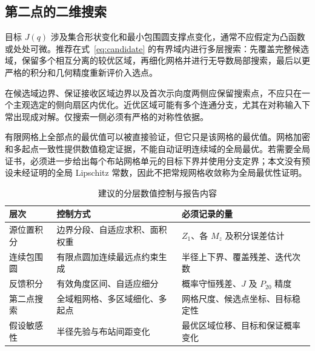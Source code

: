 \documentclass[UTF8,a4paper,zihao=-4,fontset=none]{ctexart}
\numberwithin{equation}{section}
\theoremstyle{definition}
\begin{document}
\subsection{第二点的二维搜索}
目标 \(J(q)\) 涉及集合形状变化和最小包围圆支撑点变化，通常不应假定为凸函数或处处可微。推荐在式~\eqref{eq:candidate} 的有界域内进行多层搜索：先覆盖完整候选域，保留多个相互分离的较优区域，再细化网格并进行无导数局部搜索，最后以更严格的积分和几何精度重新评价入选点。

在候选域边界、保证接收区域边界以及首次示向度两侧应保留搜索点，不应只在一个主观选定的侧向扇区内优化。近优区域可能有多个连通分支，尤其在对称输入下常出现成对解。仅搜索一侧必须有严格的对称性依据。

有限网格上全部点的最优值可以被直接验证，但它只是该网格的最优值。网格加密和多起点一致性提供数值稳定证据，不能自动证明连续域的全局最优。若需要全局证书，必须进一步给出每个布站网格单元的目标下界并使用分支定界；本文没有预设未经证明的全局 Lipschitz 常数，因此不把常规网格收敛称为全局最优性证明。

\begin{table}[htbp]
\centering\small
\caption{建议的分层数值控制与报告内容}\label{tab:numeric}
\begin{tabularx}{\textwidth}{p{}Y Y}
\toprule 层次 & 控制方式 & 必须记录的量 \\
\midrule
源位置积分 & 边界分段、自适应求积、面积权重 & \(Z_1\)、各 \(M_z\) 及积分误差估计 \\
连续包围圆 & 有限点圆加连续最远点约束生成 & 半径上下界、覆盖残差、迭代次数 \\
反馈积分 & 有效角度区间、自适应细分 & 概率守恒残差、\(J\) 及 \(P_{20}\) 精度 \\
第二点搜索 & 全域粗网格、多区域细化、多起点 & 网格尺度、候选点坐标、目标稳定性 \\
假设敏感性 & 半径先验与布站间距变化 & 最优区域位移、目标和保证概率变化 \\
\bottomrule
\end{tabularx}
\end{table}
\end{document}
